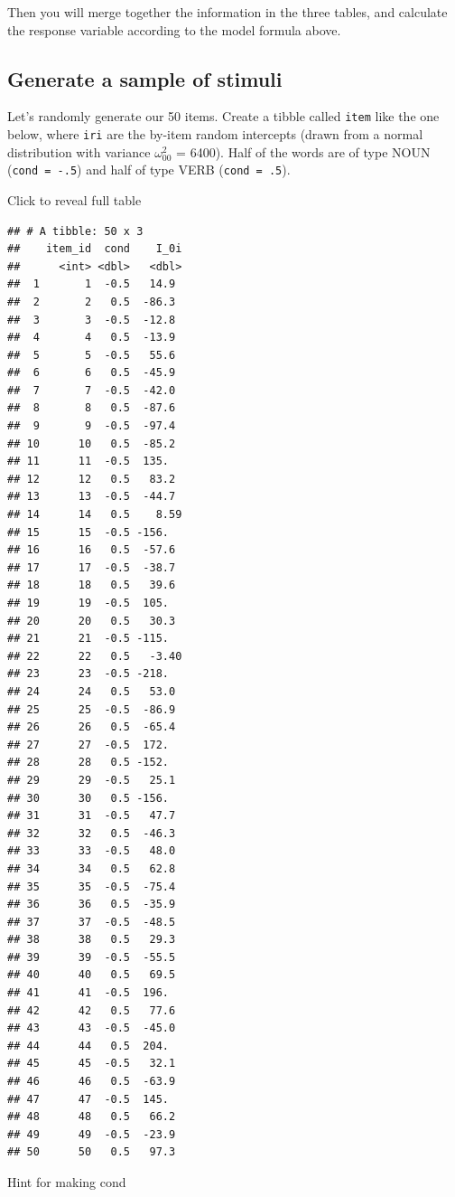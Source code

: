 \documentclass[]{book}
\begin{document}
Then you will merge together the information in the three tables, and calculate the response variable according to the model formula above.

\hypertarget{generate-a-sample-of-stimuli}{%
\subsection{Generate a sample of stimuli}\label{generate-a-sample-of-stimuli}}

Let's randomly generate our 50 items. Create a tibble called \texttt{item} like the one below, where \texttt{iri} are the by-item random intercepts (drawn from a normal distribution with variance \(\omega_{00}^2\) = 6400). Half of the words are of type NOUN (\texttt{cond\ =\ -.5}) and half of type VERB (\texttt{cond\ =\ .5}).

Click to reveal full table

\begin{verbatim}
## # A tibble: 50 x 3
##    item_id  cond    I_0i
##      <int> <dbl>   <dbl>
##  1       1  -0.5   14.9 
##  2       2   0.5  -86.3 
##  3       3  -0.5  -12.8 
##  4       4   0.5  -13.9 
##  5       5  -0.5   55.6 
##  6       6   0.5  -45.9 
##  7       7  -0.5  -42.0 
##  8       8   0.5  -87.6 
##  9       9  -0.5  -97.4 
## 10      10   0.5  -85.2 
## 11      11  -0.5  135.  
## 12      12   0.5   83.2 
## 13      13  -0.5  -44.7 
## 14      14   0.5    8.59
## 15      15  -0.5 -156.  
## 16      16   0.5  -57.6 
## 17      17  -0.5  -38.7 
## 18      18   0.5   39.6 
## 19      19  -0.5  105.  
## 20      20   0.5   30.3 
## 21      21  -0.5 -115.  
## 22      22   0.5   -3.40
## 23      23  -0.5 -218.  
## 24      24   0.5   53.0 
## 25      25  -0.5  -86.9 
## 26      26   0.5  -65.4 
## 27      27  -0.5  172.  
## 28      28   0.5 -152.  
## 29      29  -0.5   25.1 
## 30      30   0.5 -156.  
## 31      31  -0.5   47.7 
## 32      32   0.5  -46.3 
## 33      33  -0.5   48.0 
## 34      34   0.5   62.8 
## 35      35  -0.5  -75.4 
## 36      36   0.5  -35.9 
## 37      37  -0.5  -48.5 
## 38      38   0.5   29.3 
## 39      39  -0.5  -55.5 
## 40      40   0.5   69.5 
## 41      41  -0.5  196.  
## 42      42   0.5   77.6 
## 43      43  -0.5  -45.0 
## 44      44   0.5  204.  
## 45      45  -0.5   32.1 
## 46      46   0.5  -63.9 
## 47      47  -0.5  145.  
## 48      48   0.5   66.2 
## 49      49  -0.5  -23.9 
## 50      50   0.5   97.3
\end{verbatim}

Hint for making cond
\end{document}
